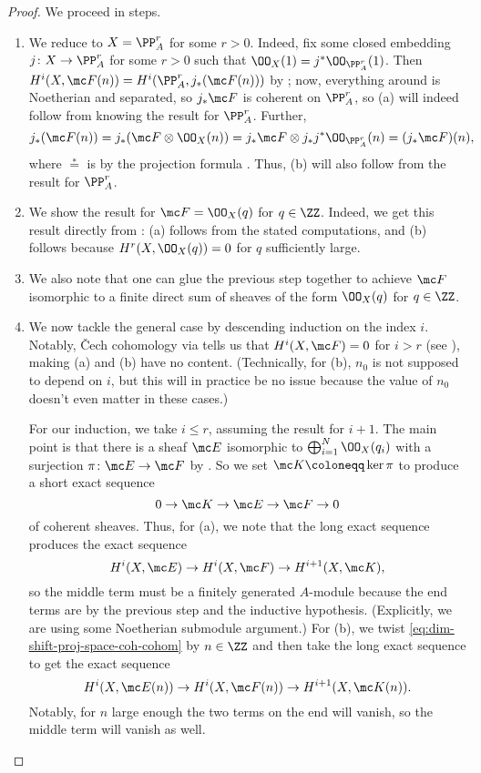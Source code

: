 \documentclass[../notes.tex]{subfiles}
\begin{document}
\begin{proof}
	We proceed in steps.
	\begin{enumerate}
		\item We reduce to $X=\PP^r_A$ for some $r>0$. Indeed, fix some closed embedding $j\colon X\to\PP^r_A$ for some $r>0$ such that $\OO_X(1)=j^*\OO_{\PP^r_A}(1)$. Then $H^i(X,\mc F(n))=H^i(\PP^r_A,j_*(\mc F(n)))$ by ; now, everything around is Noetherian and separated, so $j_*\mc F$ is coherent on $\PP^r_A$, so (a) will indeed follow from knowing the result for $\PP^r_A$. Further,
		\[j_*(\mc F(n))=j_*(\mc F\otimes\OO_X(n))=j_*\mc F\otimes j_*j^*\OO_{\PP^r_A}(n)=(j_*\mc F)(n),\]
		where $\stackrel*=$ is by the projection formula \cite[Exercise~II.5.1]{hartshorne}. Thus, (b) will also follow from the result for $\PP^r_A$.

		\item We show the result for $\mc F=\OO_X(q)$ for $q\in\ZZ$. Indeed, we get this result directly from : (a) follows from the stated computations, and (b) follows because $H^r(X,\OO_X(q))=0$ for $q$ sufficiently large.
		\item We also note that one can glue the previous step together to achieve $\mc F$ isomorphic to a finite direct sum of sheaves of the form $\OO_X(q)$ for $q\in\ZZ$.

		\item We now tackle the general case by descending induction on the index $i$. Notably, \v Cech cohomology via  tells us that $H^i(X,\mc F)=0$ for $i>r$ (see ), making (a) and (b) have no content. (Technically, for (b), $n_0$ is not supposed to depend on $i$, but this will in practice be no issue because the value of $n_0$ doesn't even matter in these cases.)

		For our induction, we take $i\le r$, assuming the result for $i+1$. The main point is that there is a sheaf $\mc E$ isomorphic to $\bigoplus_{i=1}^N\OO_X(q_i)$ with a surjection $\pi\colon\mc E\to\mc F$ by \cite[Corollary~II.5.18]{hartshorne}. So we set $\mc K\coloneqq\ker\pi$ to produce a short exact sequence
		\begin{equation}
			0\to\mc K\to\mc E\to\mc F\to0 \label{eq:dim-shift-proj-space-coh-cohom}
		\end{equation}
		of coherent sheaves. Thus, for (a), we note that the long exact sequence produces the exact sequence
		\[H^i(X,\mc E)\to H^i(X,\mc F)\to H^{i+1}(X,\mc K),\]
		so the middle term must be a finitely generated $A$-module because the end terms are by the previous step and the inductive hypothesis. (Explicitly, we are using some Noetherian submodule argument.) For (b), we twist \eqref{eq:dim-shift-proj-space-coh-cohom} by $n\in\ZZ$ and then take the long exact sequence to get the exact sequence
		\[H^i(X,\mc E(n))\to H^i(X,\mc F(n))\to H^{i+1}(X,\mc K(n)).\]
		Notably, for $n$ large enough the two terms on the end will vanish, so the middle term will vanish as well.


\end{enumerate}
\end{proof}
\end{document}
